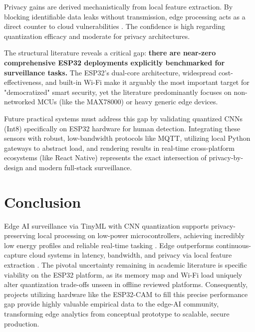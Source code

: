 \documentclass[12pt, a4paper]{article}
\begin{document}
Privacy gains are derived mechanistically from local feature extraction. By blocking identifiable data leaks without transmission, edge processing acts as a direct counter to cloud vulnerabilities \cite{yuan2020, fitwi2021}. The confidence is high regarding quantization efficacy and moderate for privacy architectures.

The structural literature reveals a critical gap: \textbf{there are near-zero comprehensive ESP32 deployments explicitly benchmarked for surveillance tasks.} The ESP32's dual-core architecture, widespread cost-effectiveness, and built-in Wi-Fi make it arguably the most important target for "democratized" smart security, yet the literature predominantly focuses on non-networked MCUs (like the MAX78000) or heavy generic edge devices.

Future practical systems must address this gap by validating quantized CNNs (Int8) specifically on ESP32 hardware for human detection. Integrating these sensors with robust, low-bandwidth protocols like MQTT, utilizing local Python gateways to abstract load, and rendering results in real-time cross-platform ecosystems (like React Native) represents the exact intersection of privacy-by-design and modern full-stack surveillance.

\section{Conclusion}
Edge AI surveillance via TinyML with CNN quantization supports privacy-preserving local processing on low-power microcontrollers, achieving incredibly low energy profiles and reliable real-time tasking \cite{moosmann2023, zhao2020}. Edge outperforms continuous-capture cloud systems in latency, bandwidth, and privacy via local feature extraction \cite{xu2021, fitwi2021}. The pivotal uncertainty remaining in academic literature is specific viability on the ESP32 platform, as its memory map and Wi-Fi load uniquely alter quantization trade-offs unseen in offline reviewed platforms. Consequently, projects utilizing hardware like the ESP32-CAM to fill this precise performance gap provide highly valuable empirical data to the edge-AI community, transforming edge analytics from conceptual prototype to scalable, secure production.
\end{document}
